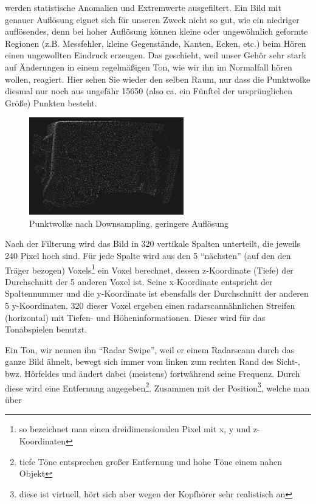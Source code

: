 \documentclass[a4paper,12pt,ngerman]{scrartcl}
\begin{document}
werden statistische Anomalien und Extremwerte ausgefiltert. Ein Bild mit genauer Auflösung eignet sich für unseren Zweck nicht so gut, wie ein niedriger
auflösendes, denn bei hoher Auflösung können kleine oder ungewöhnlich geformte Regionen (z.B. Messfehler, kleine Gegenstände, Kanten, Ecken, etc.) beim Hören
einen ungewollten Eindruck erzeugen. Das geschieht, weil unser Gehör sehr stark auf 
Änderungen in einem regelmäßigen Ton, wie wir ihn im Normalfall hören wollen, reagiert. 
Hier sehen Sie wieder den selben Raum, nur dass die Punktwolke diesmal nur noch aus ungefähr 15650 (also ca. ein Fünftel der ursprünglichen Größe) Punkten besteht. 
\begin{figure}[h]
	\centering
	\includegraphics[width=0.6\textwidth]{pointcloud_nach_downsampling_15650_punkte}
	\caption{Punktwolke nach Downsampling, geringere Auflösung}
	\label{after_downsampling}
\end{figure}
\par 
Nach der Filterung wird das Bild in 320 vertikale Spalten unterteilt, die jeweils 240 Pixel hoch sind. 
Für jede Spalte wird aus den 5 \enquote{nächsten} (auf den den Träger bezogen) Voxels\footnote{so bezeichnet man einen dreidimensionalen Pixel mit x, y und z-Koordinaten} ein Voxel berechnet,
dessen z-Koordinate (Tiefe) der Durchschnitt der 5 anderen Voxel ist. Seine x-Koordinate entspricht
der Spaltennummer und die y-Koordinate ist ebensfalls der Durchschnitt der anderen 5 y-Koordinaten. 
320 dieser Voxel ergeben einen radarscannähnlichen Streifen (horizontal) mit Tiefen- und 
Höheninformationen. Dieser wird für das Tonabspielen benutzt.\par 
Ein Ton, wir nennen ihn \enquote{Radar Swipe}, weil er einem Radarscann durch das ganze Bild ähnelt, 
bewegt sich immer vom linken zum rechten Rand des Sicht-, bwz. Hörfeldes und ändert dabei (meistens) fortwährend
seine Frequenz. Durch diese wird eine Entfernung angegeben\footnote{tiefe Töne entsprechen großer 
	Entfernung und hohe Töne einem nahen Objekt}. Zusammen mit der Position\footnote{diese ist virtuell,
	hört sich aber wegen der Kopfhörer sehr realistisch an}, welche man über
\end{document}
